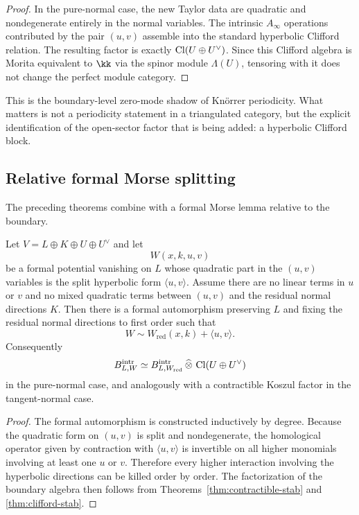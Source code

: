 \begin{proof}
In the pure-normal case, the new Taylor data are quadratic and nondegenerate entirely in the normal variables. The intrinsic $A_\infty$ operations contributed by the pair $(u,v)$ assemble into the standard hyperbolic Clifford relation. The resulting factor is exactly $\operatorname{Cl}(U\oplus U^\vee)$. Since this Clifford algebra is Morita equivalent to $\kk$ via the spinor module $\Lambda(U)$, tensoring with it does not change the perfect module category.
\end{proof}

\begin{remark}
This is the boundary-level zero-mode shadow of Kn\"orrer periodicity. What matters is not a periodicity statement in a triangulated category, but the explicit identification of the open-sector factor that is being added: a hyperbolic Clifford block.
\end{remark}

\subsection{Relative formal Morse splitting}

The preceding theorems combine with a formal Morse lemma relative to the boundary.

\begin{theorem}%
Let $V=L\oplus K\oplus U\oplus U^\vee$ and let
\[
W(x,k,u,v)
\]
be a formal potential vanishing on $L$ whose quadratic part in the $(u,v)$ variables is the split hyperbolic form $\langle u,v\rangle$. Assume there are no linear terms in $u$ or $v$ and no mixed quadratic terms between $(u,v)$ and the residual normal directions $K$. Then there is a formal automorphism preserving $L$ and fixing the residual normal directions to first order such that
\[
W \sim W_{\mathrm{red}}(x,k)+\langle u,v\rangle.
\]
Consequently
\[
B^{\mathrm{intr}}_{L,W}
\simeq
B^{\mathrm{intr}}_{L,W_{\mathrm{red}}}\,\widehat{\otimes}\,\operatorname{Cl}(U\oplus U^\vee)
\]
in the pure-normal case, and analogously with a contractible Koszul factor in the tangent-normal case.
\end{theorem}

\begin{proof}
The formal automorphism is constructed inductively by degree. Because the quadratic form on $(u,v)$ is split and nondegenerate, the homological operator given by contraction with $\langle u,v\rangle$ is invertible on all higher monomials involving at least one $u$ or $v$. Therefore every higher interaction involving the hyperbolic directions can be killed order by order. The factorization of the boundary algebra then follows from Theorems~\ref{thm:contractible-stab} and \ref{thm:clifford-stab}.
\end{proof}

